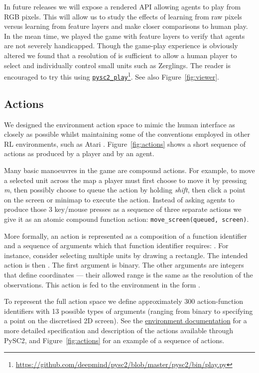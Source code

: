 \documentclass{article}
\newcommand{\footref}[2]{\href{#1}{#2}\footnote{\url{#1}}}
\begin{document}
In future releases we will expose a rendered API allowing agents to play from RGB pixels. This will allow us to study the effects of learning from raw pixels versus learning from feature layers and make closer comparisons to human play. In the mean time, we played the game with feature layers to verify that agents are not severely handicapped. Though the game-play experience is obviously altered we found that a resolution of  is sufficient to allow a human player to select and individually control small units such as Zerglings. The reader is encouraged to try this using \footref{https://github.com/deepmind/pysc2/blob/master/pysc2/bin/play.py}{\tt pysc2\_play}. See also Figure~\ref{fig:viewer}.

\subsection{Actions}

We designed the environment action space to mimic the human interface as closely as possible whilst maintaining some of the conventions employed in other RL environments, such as Atari \cite{bellemare2013arcade}. Figure~\ref{fig:actions} shows a short sequence of actions as produced by a player and by an agent.

Many basic manoeuvres in the game are compound actions. For example, to move a selected unit across the map a player must first choose to move it by pressing \textit{m}, then possibly choose to queue the action by holding \textit{shift}, then click a point on the screen or minimap to execute the action. Instead of asking agents to produce those 3 key/mouse presses as a sequence of three separate actions we give it as an atomic compound function action: {\tt move\_screen(queued, screen)}.


More formally, an action  is represented as a composition of a function identifier  and a sequence of arguments which that function identifier requires: . For instance, consider selecting multiple units by drawing a rectangle. The intended action is then .  The first argument  is binary.  The other arguments are integers that define coordinates --- their allowed range is the same as the resolution of the observations.
This action is fed to the environment in the form .

To represent the full action space we define approximately 300 action-function identifiers with 13 possible types of arguments (ranging from binary to specifying a point on the discretised 2D screen).
See the \href{https://github.com/deepmind/pysc2/blob/master/docs/environment.md}{environment documentation} for a more detailed specification and description of the actions available through PySC2, and Figure~\ref{fig:actions} for an example of a sequence of actions.
\end{document}
